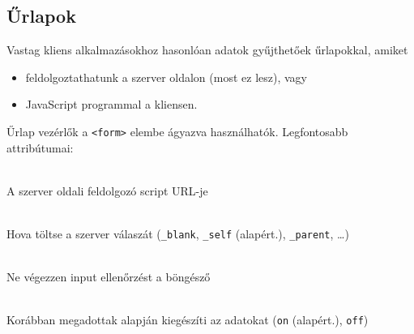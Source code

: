 \subsection{Űrlapok}

\begin{frame}
  Vastag kliens alkalmazásokhoz hasonlóan adatok gyűjthetőek űrlapokkal, amiket 
  \begin{itemize}
    \item feldolgoztathatunk a szerver oldalon (most ez lesz), vagy
    \item JavaScript programmal a kliensen.
  \end{itemize}
  Űrlap vezérlők a \texttt{<form>} elembe ágyazva használhatók. Legfontosabb attribútumai:
  \begin{description}[m]
    \item[\texttt{action}] \hfill \\ A szerver oldali feldolgozó script URL-je
    \item[\texttt{target}] \hfill \\ Hova töltse a szerver válaszát 
    (\texttt{\_blank}, \texttt{\_self} (alapért.), \texttt{\_parent}, \dots)
    \item[\texttt{novalidate}] \hfill \\ Ne végezzen input 
    ellenőrzést a böngésző
    \item[\texttt{autocomplete}] \hfill \\ Korábban megadottak alapján 
    kiegészíti az adatokat (\texttt{on} (alapért.), \texttt{off})
  \end{description}
\end{frame}


